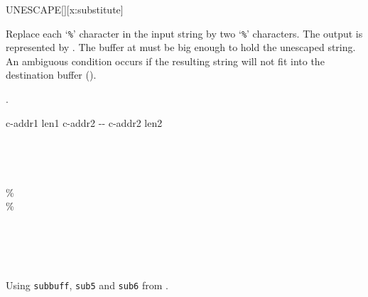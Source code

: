 \begin{worddef*}{}{UNESCAPE}[][x:substitute]
\item {}

	Replace each `\texttt{\%}' character in the input string
	 by two `\texttt{\%}' characters.  The output
	is represented by .  The buffer at 
	must be big enough to hold the unescaped string.  An ambiguous
	condition occurs if the resulting string will not fit into the
	destination buffer ().

\see {}.

	\begin{implement}
		\word{:}   c-addr1 len1 c-addr2 -{}- c-addr2 len2 \\
		  \\
		  \\
		  \\
		\tab {}    \word{+}   \\
		\tab[2]   \word{[CHAR]} \% \word{=}  \\
		\tab[3] \word{[CHAR]} \%    \\
		\tab[2]  \\
		\tab[2]      \\
		\tab {} \\
		\tab {} \word{-} \\
		\word{;}
	\end{implement}

	\begin{testing}
		Using \texttt{subbuff}, \texttt{sub5} and \texttt{sub6} from .

	\end{testing}
\end{worddef*}
\endinput
